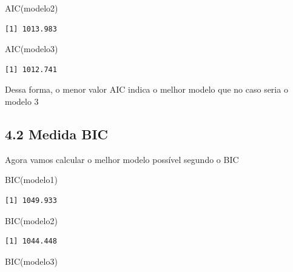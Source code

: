 \documentclass[
  letterpaper,
  DIV=11,
  numbers=noendperiod]{scrartcl}
\newenvironment{Shaded}{\begin{snugshade}}{\end{snugshade}}
\newcommand{\FunctionTok}[1]{\textcolor[rgb]{0.28,0.35,0.67}{#1}}
\newcommand{\NormalTok}[1]{\textcolor[rgb]{0.00,0.23,0.31}{#1}}
\begin{document}
\begin{Shaded}
\begin{Highlighting}[]
\FunctionTok{AIC}\NormalTok{(modelo2)}
\end{Highlighting}
\end{Shaded}

\begin{verbatim}
[1] 1013.983
\end{verbatim}

\begin{Shaded}
\begin{Highlighting}[]
\FunctionTok{AIC}\NormalTok{(modelo3)}
\end{Highlighting}
\end{Shaded}

\begin{verbatim}
[1] 1012.741
\end{verbatim}

Dessa forma, o menor valor AIC indica o melhor modelo que no caso seria
o modelo 3

\subsection{4.2 Medida BIC}\label{medida-bic}

Agora vamos calcular o melhor modelo possível segundo o BIC

\begin{Shaded}
\begin{Highlighting}[]
\FunctionTok{BIC}\NormalTok{(modelo1)}
\end{Highlighting}
\end{Shaded}

\begin{verbatim}
[1] 1049.933
\end{verbatim}

\begin{Shaded}
\begin{Highlighting}[]
\FunctionTok{BIC}\NormalTok{(modelo2)}
\end{Highlighting}
\end{Shaded}

\begin{verbatim}
[1] 1044.448
\end{verbatim}

\begin{Shaded}
\begin{Highlighting}[]
\FunctionTok{BIC}\NormalTok{(modelo3)}
\end{Highlighting}
\end{Shaded}
\end{document}
